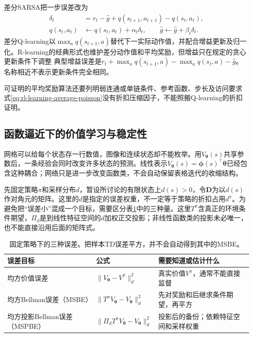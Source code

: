 差分SARSA把一步误差改为
\[
  \begin{aligned}
    \delta_t&=r_t-\widehat g+q(s_{t+1},a_{t+1})-q(s_t,a_t),\\
    q(s_t,a_t)&\leftarrow q(s_t,a_t)+\alpha_t\delta_t,\qquad
    \widehat g\leftarrow\widehat g+\beta_t\delta_t .
  \end{aligned}
\]
差分Q-learning以$\max_a q(s_{t+1},a)$替代下一实际动作值，并配合增益更新及归一化。R-learning的经典形式也维护差分动作值和平均奖励，但增益只在规定的贪心更新条件下调整
典型增益误差是$r_t+\max_aq(s_{t+1},a)-\max_aq(s_t,a)-\widehat g$。名称相近不表示更新条件完全相同。

可证明的平均奖励算法还要列明弱连通或单链条件、参考函数、步长及访问要求
式\eqref{eq:rl-learning-average-poisson}没有折扣压缩因子，不能照搬Q-learning的折扣证明。

\subsection{函数逼近下的价值学习与稳定性}
\label{sec:rl-learning-approximation}

网格可以给每个状态存一行数值，图像和连续状态却不能枚举。用$V_{\bm{\theta}}(s)$共享参数后，一条经验会同时改变许多状态的预测。线性表示$V_{\bm{\theta}}(s)=\bm{\phi}(s)^\top\bm{\theta}$已经包含这种耦合；网络只是进一步改变函数类，不会自动保留表格迭代的收缩结构。

先固定策略$\pi$和采样分布$d$，暂设所讨论的有限状态上$d(s)>0$，令$\bm{D}$为以$d(s)$作对角元的矩阵。这里的$d$是指定的误差权重，不一定等于策略的折扣占用$d^\pi$。为避免把“误差小”混成一个目标，需要区分表\ref{tab:rl-learning-value-objectives}中的三种量。这里$T^\pi$含真正的环境条件期望，$\Pi_d$是到线性特征空间的$d$加权正交投影；非线性函数类的投影未必唯一，也不能直接沿用后面的矩阵式。

\begin{table}[t]
  \centering
  \small
  \begin{tabularx}{\linewidth}{>{\raggedright\arraybackslash}p{30mm} >{\raggedright\arraybackslash}X >{\raggedright\arraybackslash}X}
    \toprule
    误差目标 & 公式 & 需要知道或估计什么 \\
    \midrule
    均方价值误差 & $\lVert V_{\bm{\theta}}-V^\pi\rVert_d^2$ & 真实价值$V^\pi$，通常不能直接监督 \\
    均方Bellman误差（MSBE） & $\lVert T^\pi V_{\bm{\theta}}-V_{\bm{\theta}}\rVert_d^2$ & 先对奖励和后继求条件期望，再平方 \\
    均方投影Bellman误差（MSPBE） & $\lVert\Pi_dT^\pi V_{\bm{\theta}}-V_{\bm{\theta}}\rVert_d^2$ & 投影后的备份；依赖特征空间和采样权重 \\
    \bottomrule
  \end{tabularx}
  \caption{固定策略下的三种误差。把样本TD误差平方，并不会自动得到其中的MSBE。}
  \label{tab:rl-learning-value-objectives}
\end{table}

